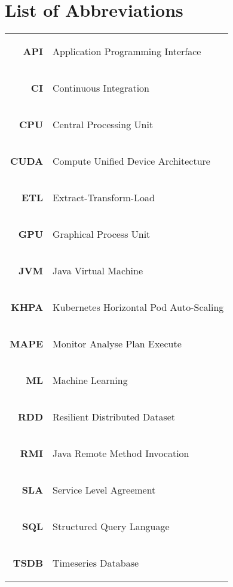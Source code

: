 \chapter*{List of Abbreviations}
%
\begin{tabular}{rl}
\hypertarget{abbr:api}{\textbf{API}} & Application Programming Interface
\\
\hypertarget{abbr:ci}{\textbf{CI}} & Continuous Integration
\\
\hypertarget{abbr:cpu}{\textbf{CPU}} & Central Processing Unit
\\
\hypertarget{abbr:cuda}{\textbf{CUDA}} & Compute Unified Device Architecture
\\
\hypertarget{abbr:etl}{\textbf{ETL}} & Extract-Transform-Load
\\
\hypertarget{abbr:gpu}{\textbf{GPU}} & Graphical Process Unit
\\
\hypertarget{abbr:jvm}{\textbf{JVM}} & Java Virtual Machine
\\
\hypertarget{abbr:khpa}{\textbf{KHPA}} & Kubernetes Horizontal Pod Auto-Scaling
\\
\hypertarget{abbr:mape}{\textbf{MAPE}} & Monitor Analyse Plan Execute
\\
\hypertarget{abbr:ml}{\textbf{ML}} & Machine Learning
\\
\hypertarget{abbr:rdd}{\textbf{RDD}} & Resilient Distributed Dataset
\\
\hypertarget{abbr:rmi}{\textbf{RMI}} & Java Remote Method Invocation
\\
\hypertarget{abbr:sla}{\textbf{SLA}} & Service Level Agreement
\\
\hypertarget{abbr:sql}{\textbf{SQL}} & Structured Query Language
\\
\hypertarget{abbr:tsdb}{\textbf{TSDB}} & Timeseries Database
\end{tabular}